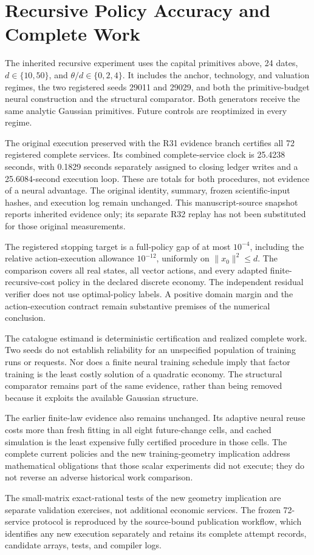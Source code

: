 \section{Recursive Policy Accuracy and Complete Work}\label{sec:r32evidence}
The inherited recursive experiment uses the capital primitives above, 24 dates,
$d\in\{10,50\}$, and $\theta/d\in\{0,2,4\}$. It includes the anchor,
technology, and valuation regimes, the two registered seeds 29011 and 29029,
and both the primitive-budget neural construction and the structural
comparator. Both generators receive the same analytic Gaussian primitives.
Future controls are reoptimized in every regime.

The original execution preserved with the R31 evidence branch certifies all
72 registered complete services. Its combined complete-service clock is
25.4238 seconds, with 0.1829 seconds separately assigned to closing ledger
writes and a 25.6084-second execution loop. These are totals for both
procedures, not evidence of a neural advantage. The original identity,
summary, frozen scientific-input hashes, and execution log remain unchanged.
This manuscript-source snapshot reports inherited evidence only; its separate
R32 replay has not been substituted for those original measurements.

The registered stopping target is a full-policy gap of at most $10^{-4}$,
including the relative action-execution allowance $10^{-12}$, uniformly on
$\|x_0\|^2\leq d$. The comparison covers all real states, all vector actions,
and every adapted finite-recursive-cost policy in the declared discrete
economy. The independent residual verifier does not use optimal-policy
labels. A positive domain margin and the action-execution contract remain
substantive premises of the numerical conclusion.

The catalogue estimand is deterministic certification and realized complete
work. Two seeds do not establish reliability for an unspecified population of
training runs or requests. Nor does a finite neural training schedule imply
that factor training is the least costly solution of a quadratic economy.
The structural comparator remains part of the same evidence, rather than
being removed because it exploits the available Gaussian structure.

The earlier finite-law evidence also remains unchanged. Its adaptive neural
reuse costs more than fresh fitting in all eight future-change cells, and
cached simulation is the least expensive fully certified procedure in those
cells. The complete current policies and the new training-geometry implication
address mathematical obligations that those scalar experiments did not
execute; they do not reverse an adverse historical work comparison.

The small-matrix exact-rational tests of the new geometry implication are
separate validation exercises, not additional economic services. The frozen
72-service protocol is reproduced by the source-bound publication workflow,
which identifies any new execution separately and retains its complete
attempt records, candidate arrays, tests, and compiler logs.
